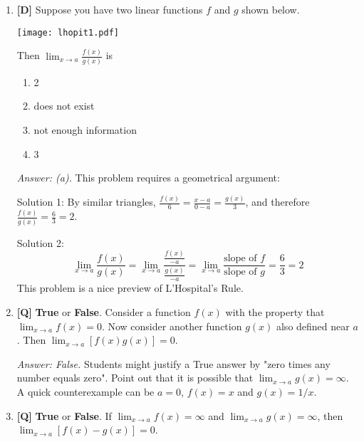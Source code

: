 \documentclass[12pt]{article}
\begin{document}
\begin{enumerate}
{\it Answer: (d).} As in the previous problem, the function oscillates and $1/0$ is undefined, however, this limit exists. This is also a nice application of The Squeeze Theorem: 
$$\displaystyle{\lim_{x\rightarrow 0} (-x^2)}\le \displaystyle{\lim_{x\rightarrow 0}x^2\sin (1/x)} \le \displaystyle{\lim_{x\rightarrow 0} x^2}$$
Therefore, the limit equals $0$.

\bigskip

\item {\bf [D]} Suppose you have two linear functions $f$ and $g$ shown below.

\begin{center}
\texttt{[image: lhopit1.pdf]}
\end{center}

Then $\displaystyle{\lim_{x\rightarrow a}\frac{f(x)}{g(x)}}$ is
\begin {enumerate}
\item 2
\item does not exist
\item not enough information
\item 3
\end{enumerate}
{\it Answer: (a).} This problem requires a geometrical argument:

Solution 1: By similar triangles, $\frac{f(x)}{6}=\frac{ x-a}{0-a}=\frac{ g(x)}{3}$, and therefore $\frac {f(x)}{g(x)}=\frac {6}{3}=2$.

Solution 2:
$$\displaystyle{\lim_{x\rightarrow a} \frac {f(x)}{g(x)}}=\displaystyle{\lim_{x\rightarrow a} \frac {\frac{f(x)}{-a}}{\frac{g(x)}{-a}}}=\displaystyle{\lim_{x\rightarrow a} \frac {\mbox{slope of } f}{\mbox{slope of } g}}=\frac{6}{3}=2$$
This problem is a nice preview of L'Hospital's Rule.

\bigskip

\item {\bf [Q]} \textbf{True} or \textbf{False}.
Consider a function $f(x)$ with the property that 
$\displaystyle{\lim_{x\rightarrow a} f(x) =0}$.  Now consider another function $g(x)$ also defined near $a$.  Then 
$\displaystyle{\lim_{x\rightarrow a} [f(x)g(x)] = 0}$.

{\it Answer: False.} Students might justify a True answer by "zero times any number equals zero". Point out that it is possible that $\displaystyle{\lim_{x\rightarrow a} g(x) =\infty}$. A quick counterexample can be $a=0$, $f(x)=x$ and $g(x)=1/x$.

\bigskip

\item {\bf [Q]} \textbf{True} or \textbf{False}. 
If $\displaystyle{\lim_{x\rightarrow a} f(x) =\infty}$ and 
$\displaystyle{\lim_{x\rightarrow a} g(x) =\infty}$, then 
$\displaystyle{\lim_{x\rightarrow a} [f(x)-g(x)] =0}$.


\end{enumerate}
\end{document}
